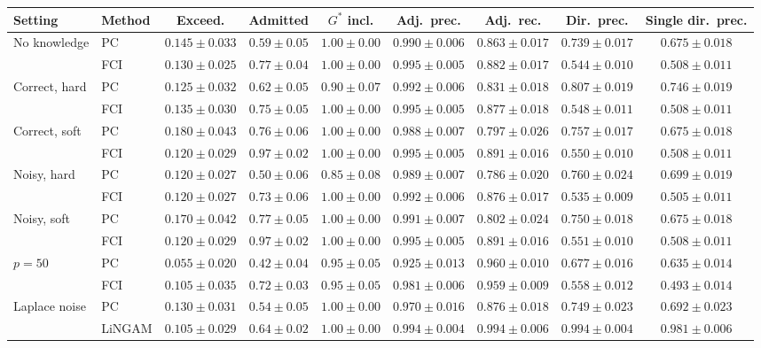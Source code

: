 \begin{tabular}{llccccccc}
\toprule
Setting & Method & Exceed. & Admitted & $G^\ast$ incl. & Adj.\ prec. & Adj.\ rec. & Dir.\ prec. & Single dir.\ prec. \\
\midrule
No knowledge & PC & $0.145\pm0.033$ & $0.59\pm0.05$ & $1.00\pm0.00$ & $0.990\pm0.006$ & $0.863\pm0.017$ & $0.739\pm0.017$ & $0.675\pm0.018$ \\
 & FCI & $0.130\pm0.025$ & $0.77\pm0.04$ & $1.00\pm0.00$ & $0.995\pm0.005$ & $0.882\pm0.017$ & $0.544\pm0.010$ & $0.508\pm0.011$ \\
Correct, hard & PC & $0.125\pm0.032$ & $0.62\pm0.05$ & $0.90\pm0.07$ & $0.992\pm0.006$ & $0.831\pm0.018$ & $0.807\pm0.019$ & $0.746\pm0.019$ \\
 & FCI & $0.135\pm0.030$ & $0.75\pm0.05$ & $1.00\pm0.00$ & $0.995\pm0.005$ & $0.877\pm0.018$ & $0.548\pm0.011$ & $0.508\pm0.011$ \\
Correct, soft & PC & $0.180\pm0.043$ & $0.76\pm0.06$ & $1.00\pm0.00$ & $0.988\pm0.007$ & $0.797\pm0.026$ & $0.757\pm0.017$ & $0.675\pm0.018$ \\
 & FCI & $0.120\pm0.029$ & $0.97\pm0.02$ & $1.00\pm0.00$ & $0.995\pm0.005$ & $0.891\pm0.016$ & $0.550\pm0.010$ & $0.508\pm0.011$ \\
Noisy, hard & PC & $0.120\pm0.027$ & $0.50\pm0.06$ & $0.85\pm0.08$ & $0.989\pm0.007$ & $0.786\pm0.020$ & $0.760\pm0.024$ & $0.699\pm0.019$ \\
 & FCI & $0.120\pm0.027$ & $0.73\pm0.06$ & $1.00\pm0.00$ & $0.992\pm0.006$ & $0.876\pm0.017$ & $0.535\pm0.009$ & $0.505\pm0.011$ \\
Noisy, soft & PC & $0.170\pm0.042$ & $0.77\pm0.05$ & $1.00\pm0.00$ & $0.991\pm0.007$ & $0.802\pm0.024$ & $0.750\pm0.018$ & $0.675\pm0.018$ \\
 & FCI & $0.120\pm0.029$ & $0.97\pm0.02$ & $1.00\pm0.00$ & $0.995\pm0.005$ & $0.891\pm0.016$ & $0.551\pm0.010$ & $0.508\pm0.011$ \\
$p{=}50$ & PC & $0.055\pm0.020$ & $0.42\pm0.04$ & $0.95\pm0.05$ & $0.925\pm0.013$ & $0.960\pm0.010$ & $0.677\pm0.016$ & $0.635\pm0.014$ \\
 & FCI & $0.105\pm0.035$ & $0.72\pm0.03$ & $0.95\pm0.05$ & $0.981\pm0.006$ & $0.959\pm0.009$ & $0.558\pm0.012$ & $0.493\pm0.014$ \\
Laplace noise & PC & $0.130\pm0.031$ & $0.54\pm0.05$ & $1.00\pm0.00$ & $0.970\pm0.016$ & $0.876\pm0.018$ & $0.749\pm0.023$ & $0.692\pm0.023$ \\
 & LiNGAM & $0.105\pm0.029$ & $0.64\pm0.02$ & $1.00\pm0.00$ & $0.994\pm0.004$ & $0.994\pm0.006$ & $0.994\pm0.004$ & $0.981\pm0.006$ \\

\end{tabular}
